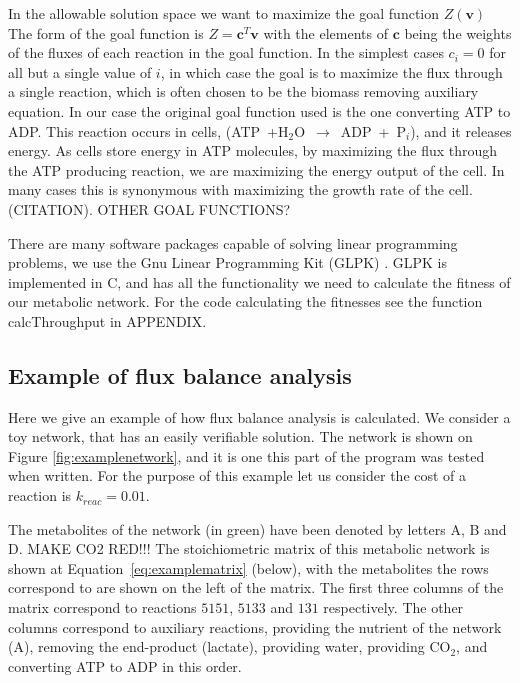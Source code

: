 \documentclass[10pt,a4paper]{article}
\begin{document}
	In the allowable solution space we want to maximize the goal function $Z \left( \mathbf{v} \right)$ The form of the goal function is $Z=\mathbf{c}^T \mathbf{v}$ with the elements of $\mathbf{c}$ being the weights of the fluxes of each reaction in the goal function. In the simplest cases $c_i=0$ for all but a single value of $i$, in which case the goal is to maximize the flux through a single reaction, which is often chosen to be the biomass removing auxiliary equation. In our case the original goal function used is the one converting ATP to ADP. This reaction occurs in cells, (ATP~+H$_2$O~$\rightarrow$~ADP~+~P$_i$), and it releases energy. As cells store energy in ATP molecules,  by maximizing the flux through the ATP producing reaction, we are maximizing the energy output of the cell. In many cases this is synonymous with maximizing the growth rate of the cell. (CITATION). OTHER GOAL FUNCTIONS?
	
	There are many software packages capable of solving linear programming problems, we use the Gnu Linear Programming Kit (GLPK) \cite{glpk}. GLPK is implemented in C, and has all the functionality we need to calculate the fitness of our metabolic network. For the code calculating the fitnesses see the function calcThroughput in APPENDIX.


\subsection{Example of flux balance analysis}
\label{sub:example_of_flux_balance_analysis}

Here we give an example of how flux balance analysis is calculated. We consider a toy network, that has an easily verifiable solution. The network is shown on Figure \ref{fig:examplenetwork}, and it is one this part of the program was tested when written. For the purpose of this example let us consider the cost of a reaction is $k_{reac}=0.01$.


	The metabolites of the network (in green) have been denoted by letters A, B and D. MAKE CO2 RED!!! The stoichiometric matrix of this metabolic network is shown at Equation~\ref{eq:examplematrix} (below), with the metabolites the rows correspond to are shown on the left of the matrix. The first three columns of the matrix correspond to reactions $5151$, $5133$ and $131$ respectively. The other columns correspond to auxiliary reactions, providing the nutrient of the network (A), removing the end-product (lactate), providing water, providing CO$_2$, and converting ATP to ADP in this order.
\end{document}
